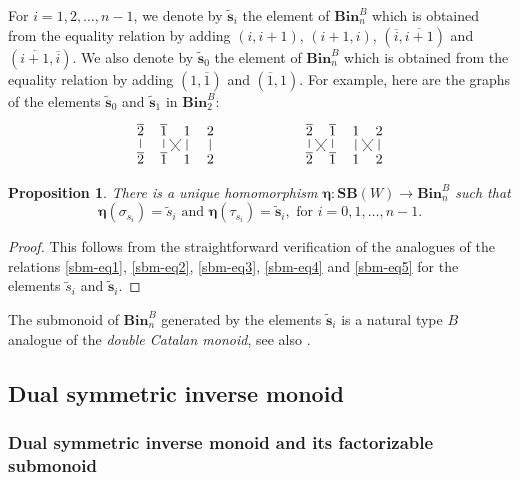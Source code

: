 \documentclass[a4paper]{amsart}
\newtheorem{proposition}[theorem]{Proposition}
\begin{document}
For $i=1,2,\dots,n-1$, we denote by $\tilde{\mathbf{s}}_i$ the element
of $\mathbf{Bin}_n^B$ which is obtained 
from the equality relation by adding $(i,i+1)$, $(i+1,i)$, 
$(\overline{i},\overline{i+1})$ and $(\overline{i+1},\overline{i})$.
We also denote by $\tilde{\mathbf{s}}_0$ the 
element of $\mathbf{Bin}_n^B$ which is obtained 
from the equality relation by adding $(1,\overline{1})$ and $(\overline{1},1)$.
For example,  here are the graphs of the elements $\tilde{\mathbf{s}}_0$
and $\tilde{\mathbf{s}}_1$ in $\mathbf{Bin}_2^B$:
\begin{displaymath}
\xymatrix@C=2mm@R=2mm{
\overline{2}\ar@{-}[d]&\overline{1}\ar@{-}[d]\ar@{-}[dr]&1\ar@{-}[d]\ar@{-}[dl]&2\ar@{-}[d]\\
\overline{2}&\overline{1}&1&2}\qquad\qquad\qquad
\xymatrix@C=2mm@R=2mm{
\overline{2}\ar@{-}[dr]\ar@{-}[d]&\overline{1}\ar@{-}[d]\ar@{-}[dl]
&1\ar@{-}[d]\ar@{-}[dr]&2\ar@{-}[d]\ar@{-}[dl]\\
\overline{2}&\overline{1}&1&2}
\end{displaymath}

\begin{proposition}\label{prop-4.7.4-1}
There is a unique homomorphism $\boldsymbol{\eta}:\mathbf{SB}(W)\to\mathbf{Bin}_n^B$
such that
\begin{displaymath}
\boldsymbol{\eta}(\sigma_{s_i})=\tilde{s}_i\text{ and }
\boldsymbol{\eta}(\tau_{s_i})=\tilde{\mathbf{s}}_i,\text{ for }i=0,1,\dots,n-1.
\end{displaymath}
\end{proposition}

\begin{proof}
This follows from the straightforward verification of the analogues  of the relations 
\eqref{sbm-eq1}, \eqref{sbm-eq2}, \eqref{sbm-eq3}, \eqref{sbm-eq4} and \eqref{sbm-eq5} for the 
elements $\tilde{s}_i$  and $\tilde{\mathbf{s}}_i$.  
\end{proof}

The submonoid of $\mathbf{Bin}_n^B$ generated by the elements $\tilde{\mathbf{s}}_i$ 
is a natural type $B$ analogue of the {\em double Catalan monoid},
see also \cite[Subsection~6.2]{MaSt}. 


\subsection{Dual symmetric inverse monoid}\label{s4.3}

\subsubsection{Dual symmetric inverse monoid and its factorizable submonoid}\label{s4.3.1}
\end{document}
